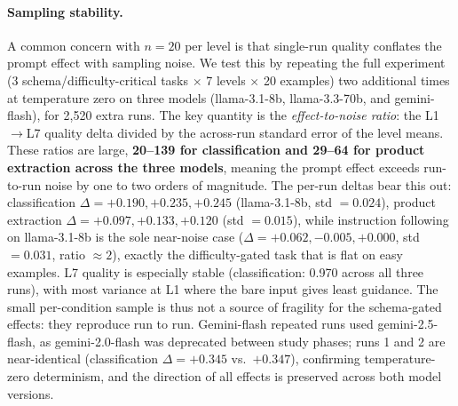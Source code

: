 \paragraph{Sampling stability.}
A common concern with $n=20$ per level is that single-run quality conflates the
prompt effect with sampling noise. We test this by repeating the full experiment
(3 schema/difficulty-critical tasks $\times$ 7 levels $\times$ 20 examples) two
additional times at temperature zero on three models (llama-3.1-8b,
llama-3.3-70b, and gemini-flash), for 2,520 extra runs. The key quantity is the
\emph{effect-to-noise ratio}: the L1$\to$L7 quality delta divided by the
across-run standard error of the level means. These ratios are large,
\textbf{20--139 for classification and 29--64 for product extraction across the
three models}, meaning the prompt effect exceeds run-to-run noise by one to two
orders of magnitude. The per-run deltas bear this out: classification
$\Delta = +0.190, +0.235, +0.245$ (llama-3.1-8b, std $= 0.024$), product
extraction $\Delta = +0.097, +0.133, +0.120$ (std $= 0.015$), while instruction
following on llama-3.1-8b is the sole near-noise case ($\Delta = +0.062, -0.005,
+0.000$, std $= 0.031$, ratio $\approx 2$), exactly the difficulty-gated task
that is flat on easy examples. L7 quality is especially stable (classification:
0.970 across all three runs), with most variance at L1 where the bare input
gives least guidance. The small per-condition sample is thus not a source of
fragility for the schema-gated effects: they reproduce run to run. Gemini-flash
repeated runs used gemini-2.5-flash, as gemini-2.0-flash was deprecated between
study phases; runs 1 and 2 are near-identical (classification $\Delta = +0.345$
vs.\ $+0.347$), confirming temperature-zero determinism, and the direction of
all effects is preserved across both model versions.
